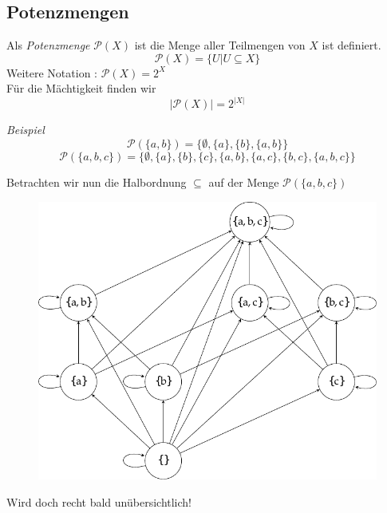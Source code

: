 \subsection{Potenzmengen}
\begin{frame}
	\begin{Definition}
		Als \emph{Potenzmenge} $\mathcal{P}(X)$ ist die Menge aller Teilmengen von $X$ ist definiert. $$ \mathcal{P}(X) = \{ U | U\subseteq X\} $$
		Weitere Notation : $ \mathcal{P}(X) = 2^X $ \\
		
		Für die Mächtigkeit finden wir $$ \vert \mathcal{P}(X) \vert = 2^{\vert X \vert} $$
	\end{Definition} 
	\pause 
	\emph{Beispiel}
	$$ \mathcal{P}(\{a,b\}) = \{ \emptyset, \{a\}, \{b\}, \{a,b\} \} $$
	\pause
	$$\mathcal{P}(\{a,b,c\}) = \{ \emptyset, \{a\}, \{b\}, \{c\}, \{a,b\}, \{a,c\}, \{b,c\}, \{a,b,c\} \} $$
\end{frame}

\begin{frame}
	Betrachten wir nun die Halbordnung $\subseteq$ auf der Menge $\mathcal{P}(\{a,b,c\})$ \pause
	\begin{figure}[H]
		\centering
		\includegraphics[scale=0.7]{../figures/halbordnungen/Halbordnung.pdf}
	\end{figure} \pause
	Wird doch recht bald unübersichtlich!
\end{frame}

